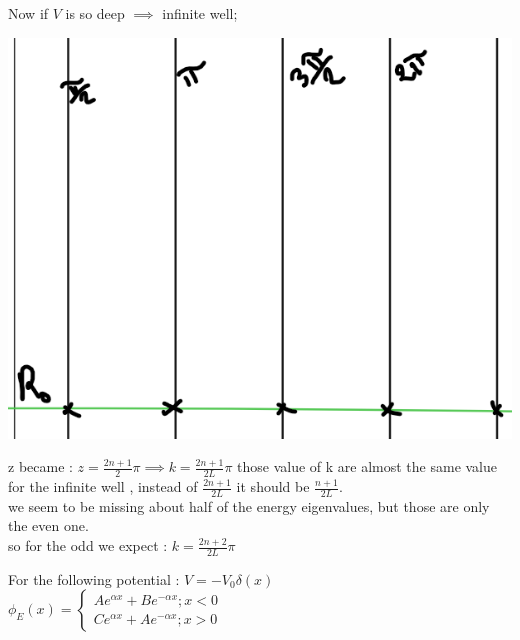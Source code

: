\documentclass[12pt,oneside]{book}
\begin{document}
\begin{itemize}
			Now if $V $ is so deep $\implies$ infinite well;
			\begin{center}
				\includegraphics[width=0.5\linewidth]{../pic/3302/22.png}
			\end{center}
			z became : $z = \frac{2n+1}{2}\pi \implies k = \frac{2n+1}{2L}\pi$
			those value of k are almost the same value for the infinite well , instead of $\frac{2n+1}{2L}$ it should be $\frac{n+1}{2L}$.\\
			we seem to be missing about half of the energy eigenvalues, but those are only the even one.\\
			so for the odd we expect : $k = \frac{2n+2}{2L}\pi$

			For the following potential : $ V =- V_0\delta(x) $ \\
			$\phi_E(x) = \begin{cases}
				Ae^{\alpha x} + Be^{-\alpha x}  ; x< 0 \\
				Ce^{\alpha x} + A e^{-\alpha x} ; x>0
			\end{cases}$
	\end{itemize}
\end{document}
